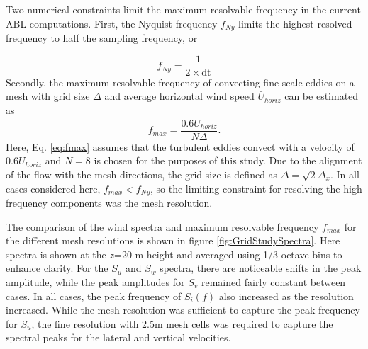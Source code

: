 Two numerical constraints limit the maximum resolvable frequency in
the current ABL computations.  First, the Nyquist frequency $f_{Ny}$
limits the highest resolved frequency to half the sampling frequency, or

\begin{equation}
  f_{Ny} = \frac{1}{2\times \textrm{dt}}
\end{equation}
Secondly, the maximum resolvable frequency of convecting fine scale
eddies on a mesh with grid size $\Delta$ and average horizontal wind
speed $\bar{U}_{horiz}$ can be estimated as
\begin{equation}
  \label{eq:fmax}
  f_{max} = \frac{0.6\bar{U}_{horiz}}{N\Delta}.
\end{equation}
Here, Eq. \ref{eq:fmax} assumes that the turbulent eddies convect
with a velocity of $0.6\bar{U}_{horiz}$ and $N=8$ is chosen for the
purposes of this study.  Due to the alignment of the flow with the
mesh directions, the grid size is defined as $\Delta = \sqrt{2} \Delta_x $.
In all cases considered here, $f_{max} < f_{Ny}$, so the limiting
constraint for resolving the high frequency components was the mesh
resolution.

The comparison of the wind spectra and maximum resolvable frequency
$f_{max}$ for the different mesh resolutions is shown in figure
\ref{fig:GridStudySpectra}.  Here spectra is shown at the $z$=20 m
height and averaged using 1/3 octave-bins to enhance clarity. For the
$S_u$ and $S_w$ spectra, there are noticeable shifts in the peak
amplitude, while the peak amplitudes for $S_v$ remained fairly
constant between cases.  In all cases, the peak frequency of $S_i(f)$
also increased as the resolution increased. While the mesh resolution
was sufficient to capture the peak frequency for $S_u$, the fine
resolution with 2.5m mesh cells was required to capture the spectral
peaks for the lateral and vertical velocities.

